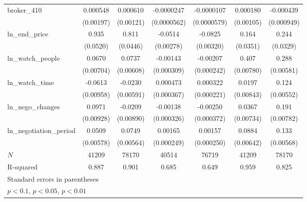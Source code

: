 {\begin{tabular}{l*{6}{c}}
\addlinespace
broker\_410  &    0.000548         &    0.000610         &  -0.0000247         &  -0.0000107         &    0.000180         &   -0.000439         \\
            &   (0.00197)         &   (0.00121)         & (0.0000562)         & (0.0000579)         &   (0.00105)         &  (0.000949)         \\
\addlinespace
ln\_end\_price&       0.935\sym{***}&       0.811\sym{***}&     -0.0514\sym{***}&     -0.0825\sym{***}&       0.164\sym{***}&       0.244\sym{***}\\
            &    (0.0520)         &    (0.0446)         &   (0.00278)         &   (0.00320)         &    (0.0351)         &    (0.0329)         \\
\addlinespace
ln\_watch\_people&      0.0670\sym{***}&      0.0737\sym{***}&    -0.00143\sym{***}&    -0.00207\sym{***}&       0.407\sym{***}&       0.288\sym{***}\\
            &   (0.00704)         &   (0.00608)         &  (0.000309)         &  (0.000242)         &   (0.00780)         &   (0.00581)         \\
\addlinespace
ln\_watch\_time&     -0.0613\sym{***}&     -0.0230\sym{***}&    0.000473         &    0.000322         &      0.0197\sym{**} &       0.124\sym{***}\\
            &   (0.00958)         &   (0.00591)         &  (0.000367)         &  (0.000221)         &   (0.00843)         &   (0.00552)         \\
\addlinespace
ln\_nego\_changes&      0.0971\sym{***}&     -0.0209\sym{**} &    -0.00138\sym{***}&    -0.00250\sym{***}&      0.0367\sym{***}&       0.191\sym{***}\\
            &   (0.00928)         &   (0.00890)         &  (0.000326)         &  (0.000372)         &   (0.00734)         &   (0.00782)         \\
\addlinespace
ln\_negotiation\_period&      0.0509\sym{***}&      0.0749\sym{***}&     0.00165\sym{***}&     0.00157\sym{***}&      0.0884\sym{***}&       0.133\sym{***}\\
            &   (0.00578)         &   (0.00564)         &  (0.000249)         &  (0.000250)         &   (0.00642)         &   (0.00568)         \\
\midrule
\(N\)       &       41209         &       78170         &       40514         &       76719         &       41209         &       78170         \\
R-squared   &       0.887         &       0.901         &       0.685         &       0.649         &       0.959         &       0.825         \\
\bottomrule
\multicolumn{7}{l}{\footnotesize Standard errors in parentheses}\\
\multicolumn{7}{l}{\footnotesize \sym{*} \(p<0.1\), \sym{**} \(p<0.05\), \sym{***} \(p<0.01\)}\\
\end{tabular}
}
